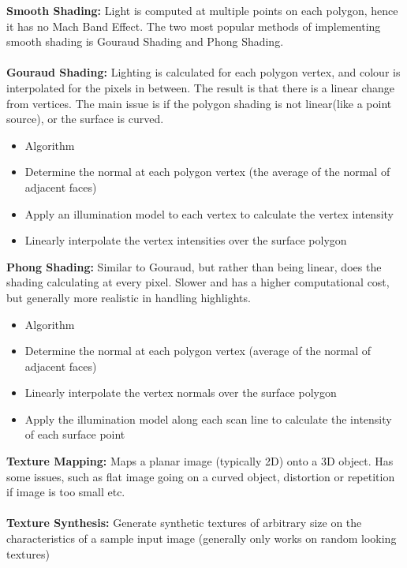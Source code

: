 \documentclass[a4paper,10pt]{article}
\begin{document}
\textcolor{WildStrawberry}{\textbf{Smooth Shading:}} Light is computed at multiple points on each polygon, hence it has no Mach Band Effect. The two most popular methods of implementing smooth shading is Gouraud Shading and Phong Shading. \\ \\
\textcolor{WildStrawberry}{\textbf{Gouraud Shading:}} Lighting is calculated for each polygon vertex, and colour is interpolated for the pixels in between. The result is that there is a linear change from vertices. The main issue is if the polygon shading is not linear(like a point source), or the surface is curved.
\renewcommand{\labelitemi}{\textperiodcentered}
\begin{itemize}
\item \textcolor{WildStrawberry}{Algorithm} 
\item Determine the normal at each polygon vertex (the average of the normal of adjacent faces)
\item Apply an illumination model to each vertex to calculate the vertex intensity
\item Linearly interpolate the vertex intensities over the surface polygon
\end{itemize}
\textcolor{WildStrawberry}{\textbf{Phong Shading:}} Similar to Gouraud, but rather than being linear, does the shading calculating at every pixel. Slower and has a higher computational cost, but generally more realistic in handling highlights. 
\renewcommand{\labelitemi}{\textperiodcentered}
\begin{itemize}
\item \textcolor{WildStrawberry}{Algorithm} 
\item Determine the normal at each polygon vertex (average of the normal of adjacent faces)
\item Linearly interpolate the vertex normals over the surface polygon
\item Apply the illumination model along each scan line to calculate the intensity of each surface point
\end{itemize}
\noindent \textcolor{WildStrawberry}{\textbf{Texture Mapping:}} Maps a planar image (typically 2D) onto a 3D object. Has some issues, such as flat image going on a curved object, distortion or repetition if image is too small etc. \\ \\
\textcolor{WildStrawberry}{\textbf{Texture Synthesis:}} Generate synthetic textures of arbitrary size on the characteristics of a sample input image (generally only works on random looking textures) \\ \\
\end{document}

